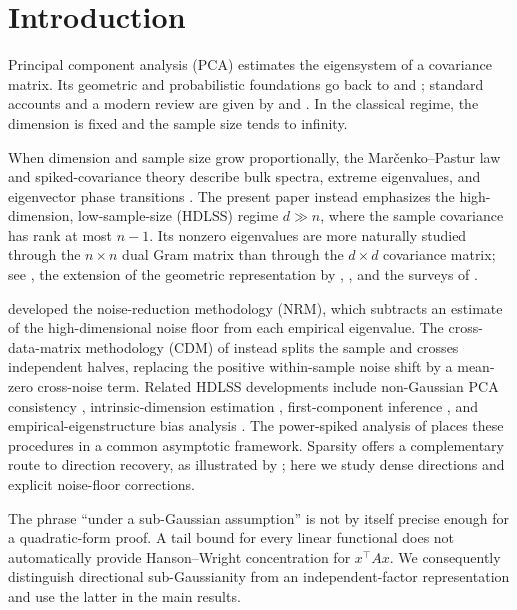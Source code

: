 \section{Introduction}\label{sec:intro}
\enlargethispage{2pt}
Principal component analysis (PCA) estimates the eigensystem of a covariance matrix.  Its geometric and probabilistic foundations go back to \citet{Pearson1901} and \citet{Hotelling1933}; standard accounts and a modern review are given by \citet{Jolliffe2002} and \citet{JolliffeCadima2016}.  In the classical regime, the dimension is fixed and the sample size tends to infinity.

When dimension and sample size grow proportionally, the Mar\v{c}enko--Pastur law and spiked-covariance theory describe bulk spectra, extreme eigenvalues, and eigenvector phase transitions \citep{MarchenkoPastur1967,Johnstone2001,BaikEtAl2005,BaikSilverstein2006,Paul2007}.  The present paper instead emphasizes the high-dimension, low-sample-size (HDLSS) regime $d\gg n$, where the sample covariance has rank at most $n-1$.  Its nonzero eigenvalues are more naturally studied through the $n\times n$ dual Gram matrix than through the $d\times d$ covariance matrix; see \citet{HallMarronNeeman2005}, the extension of the geometric representation by \citet{AhnEtAl2007}, \citet{JungMarron2009}, and the surveys of \citet{AoshimaYata2017,AoshimaEtAl2018}.

\citet{YataAoshima2012} developed the noise-reduction methodology (NRM), which subtracts an estimate of the high-dimensional noise floor from each empirical eigenvalue.  The cross-data-matrix methodology (CDM) of \citet{YataAoshima2010} instead splits the sample and crosses independent halves, replacing the positive within-sample noise shift by a mean-zero cross-noise term.  Related HDLSS developments include non-Gaussian PCA consistency \citep{YataAoshima2009}, intrinsic-dimension estimation \citep{YataAoshima2010Intrinsic}, first-component inference \citep{IshiiEtAl2016}, and empirical-eigenstructure bias analysis \citep{WangFan2017}.  The power-spiked analysis of \citet{YataAoshima2013} places these procedures in a common asymptotic framework.  Sparsity offers a complementary route to direction recovery, as illustrated by \citet{JohnstoneLu2009}; here we study dense directions and explicit noise-floor corrections.

The phrase ``under a sub-Gaussian assumption'' is not by itself precise enough for a quadratic-form proof.  A tail bound for every linear functional does not automatically provide Hanson--Wright concentration for $x^\top A x$.  We consequently distinguish directional sub-Gaussianity from an independent-factor representation and use the latter in the main results.

